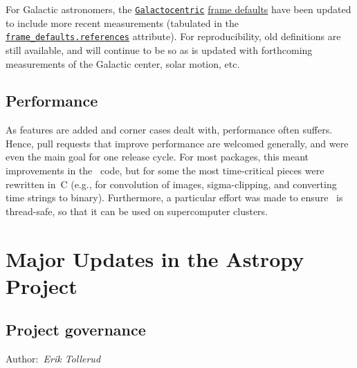 \documentclass[modern]{aastex631}
\newcommand{\astropyapi}[2]{\href{https://docs.astropy.org/en/stable/api/astropy.#1.html}{#2}}
\newcommand{\astropyapidoc}[2]{\astropyapi{#1}{\texttt{#2}\xspace}}
\newcommand{\astropyGalactocentric}{\astropyapidoc{coordinates.builtin_frames.Galactocentric}{Galactocentric}}
\newcommand{\astropyScienceState}{\astropyapidoc{utils.state.ScienceState}{ScienceState}}
\newcommand{\secauthor}[1]{{\color{blue}Author:~\textit{#1}}}
\begin{document}
    For Galactic astronomers, the \astropyGalactocentric
    \astropyapi{coordinates.galactocentric_frame_defaults}{frame defaults} have
    been updated to include more recent measurements (tabulated in the
    \href{https://docs.astropy.org/en/stable/api/astropy.coordinates.galactocentric_frame_defaults.html#astropy.coordinates.galactocentric_frame_defaults.references}{\texttt{frame\_defaults.references}}
    attribute). For reproducibility, old definitions are still available, and will
    continue to be so as \astropypkg is updated with forthcoming measurements of
    the Galactic center, solar motion, etc.


\subsection*{Performance} \label{sec:core-features-performance}

As features are added and corner cases dealt with, performance often
suffers.  Hence, pull requests that improve performance are welcomed
generally, and were even the main goal for one release cycle.  For
most packages, this meant improvements in the \python\ code, but for
some the most time-critical pieces were rewritten in~C (e.g., for
convolution of images, sigma-clipping, and converting time strings to
binary).  Furthermore, a particular effort was made to ensure
\astropypkg\ is thread-safe, so that it can be used on supercomputer
clusters.


\section{Major Updates in the Astropy Project} \label{sec:project-updates}

\subsection{Project governance} \label{sec:project-governance}

\secauthor{Erik Tollerud}

\end{document}
